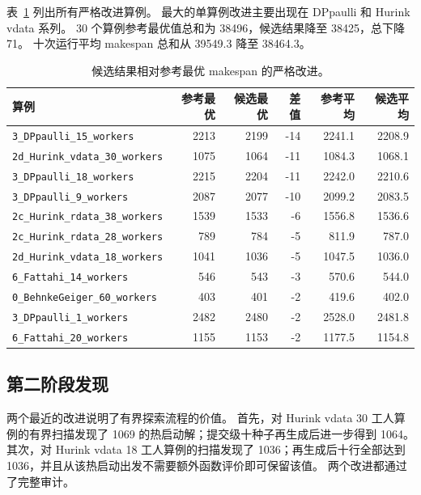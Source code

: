 \documentclass[UTF8,a4paper,zihao=-4]{ctexart}
\begin{document}
表~\ref{tab:strict-zh} 列出所有严格改进算例。
最大的单算例改进主要出现在 DPpaulli 和 Hurink vdata 系列。
30 个算例参考最优值总和为 38496，候选结果降至 38425，总下降 71。
十次运行平均 makespan 总和从 39549.3 降至 38464.3。

\begin{table}[t]
  \centering
  \caption{候选结果相对参考最优 makespan 的严格改进。}
  \label{tab:strict-zh}
  \begin{tabular}{lrrrrr}
    \toprule
    算例 & 参考最优 & 候选最优 & 差值 & 参考平均 & 候选平均 \\
    \midrule
    \texttt{3\_DPpaulli\_15\_workers} & 2213 & 2199 & -14 & 2241.1 & 2208.9 \\
    \texttt{2d\_Hurink\_vdata\_30\_workers} & 1075 & 1064 & -11 & 1084.3 & 1068.1 \\
    \texttt{3\_DPpaulli\_18\_workers} & 2215 & 2204 & -11 & 2242.0 & 2210.6 \\
    \texttt{3\_DPpaulli\_9\_workers} & 2087 & 2077 & -10 & 2099.2 & 2083.5 \\
    \texttt{2c\_Hurink\_rdata\_38\_workers} & 1539 & 1533 & -6 & 1556.8 & 1536.6 \\
    \texttt{2c\_Hurink\_rdata\_28\_workers} & 789 & 784 & -5 & 811.9 & 787.0 \\
    \texttt{2d\_Hurink\_vdata\_18\_workers} & 1041 & 1036 & -5 & 1047.5 & 1036.0 \\
    \texttt{6\_Fattahi\_14\_workers} & 546 & 543 & -3 & 570.6 & 544.0 \\
    \texttt{0\_BehnkeGeiger\_60\_workers} & 403 & 401 & -2 & 419.6 & 402.0 \\
    \texttt{3\_DPpaulli\_1\_workers} & 2482 & 2480 & -2 & 2528.0 & 2481.8 \\
    \texttt{6\_Fattahi\_20\_workers} & 1155 & 1153 & -2 & 1177.5 & 1154.8 \\
    \bottomrule
  \end{tabular}
\end{table}

\subsection{第二阶段发现}
两个最近的改进说明了有界探索流程的价值。
首先，对 Hurink vdata 30 工人算例的有界扫描发现了 1069 的热启动解；提交级十种子再生成后进一步得到 1064。
其次，对 Hurink vdata 18 工人算例的扫描发现了 1036；再生成后十行全部达到 1036，并且从该热启动出发不需要额外函数评价即可保留该值。
两个改进都通过了完整审计。
\end{document}
